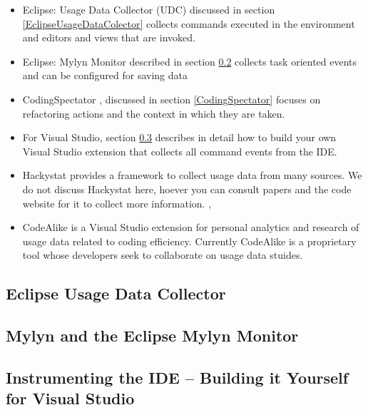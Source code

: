 \begin{itemize}

	\item Eclipse: Usage Data Collector (UDC) discussed in section \ref{EclipseUsageDataColector} collects commands executed in the environment and editors and views that are invoked.
	
	\item Eclipse: Mylyn Monitor described in section \ref{MylynMonitor} collects task oriented events and can be configured for saving data
	
	\item CodingSpectator %
, discussed in section \ref{CodingSpectator} focuses on refactoring actions and the context in which they are taken.
	
	\item For Visual Studio, section \ref{buildItYourself} describes in detail how to build your own Visual Studio extension that collects all command events from the IDE.
	
	\item Hackystat provides a framework to collect usage data from many sources.  We do not discuss Hackystat here, hoever you can consult papers and the code website for it to collect more information. \cite{V:johnson2003beyond}, %
	
	\item CodeAlike is a Visual Studio extension for personal analytics and research of usage data related to coding efficiency.  Currently CodeAlike is a proprietary tool whose developers seek to collaborate on usage data stuides.

\end{itemize}



\subsection{Eclipse Usage Data Collector}
\label{EclipseUsageDataCollector}


\subsection{Mylyn and the Eclipse Mylyn Monitor} 
\label{MylynMonitor}




\subsection{Instrumenting the IDE -- Building it Yourself for Visual Studio} 
\label{buildItYourself}



